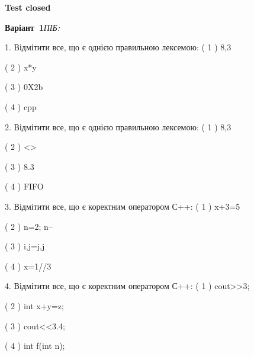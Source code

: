 \documentclass[11pt]{article}
\begin{document}
{\large\textbf{Test closed}}

\textbf{Варіант \No\,1}\hfill \textit{ПІБ:}\,\underline{\hspace{60mm}}
\vspace{4mm}

1. Відмітити все, що є однією правильною лексемою:
( 1 ) 8,3

( 2 ) x*y

( 3 ) 0X2b

( 4 ) cpp

2. Відмітити все, що є однією правильною лексемою:
( 1 ) 8,3

( 2 ) <>

( 3 ) 8.3

( 4 ) FIFO

3. Відмітити все, що є коректним оператором С++:
( 1 ) x+3=5

( 2 ) n=2; n--

( 3 ) i,j=j,j

( 4 ) x=1//3

4. Відмітити все, що є коректним оператором С++:
( 1 ) cout>>3;

( 2 ) int x+y=z;

( 3 ) cout<<3.4;

( 4 ) int f(int n);





\newpage
\end{document}
